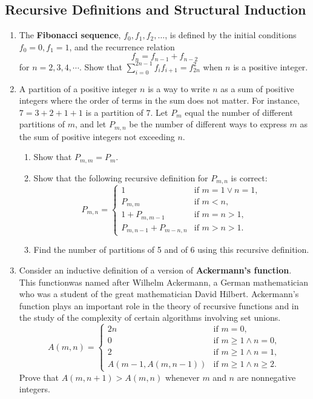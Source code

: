 \documentclass{../../cls/sig-alternate-05-2015}
\begin{document}
\subsection{Recursive Definitions and Structural Induction}
\begin{enumerate}
\item The \textbf{Fibonacci sequence},
$f_0, f_1, f_2, \ldots$,
is defined by the initial conditions $f_0 = 0, f_1 = 1$,
and the recurrence relation \begin{equation}
	f_n = f_{n - 1} + f_{n - 2}
\end{equation} for $n = 2, 3, 4, \cdots$.
Show that $\sum_{i = 0}^{2n - 1} f_i f_{i + 1} = f_{2n}^2$ when $n$ is a positive integer.

\item A partition of a positive integer $n$ is a way to write $n$ as a sum of positive integers where the order of terms in
the sum does not matter.
For instance, $7 = 3 + 2 + 1 + 1$ is a partition of $7$.
Let $P_m$ equal the number of different partitions of $m$,
and let $P_{m, n}$ be the number of different ways to express $m$ as the sum of positive integers not exceeding $n$. \begin{enumerate}
	\item Show that $P_{m, m} = P_m$.
	\item Show that the following recursive definition for $P_{m, n}$ is correct: \begin{equation}
		P_{m, n} = \begin{cases}
		1 & \text{if } m = 1 \lor n = 1,\\
		P_{m, m} & \text{if } m < n,\\
		1 + P_{m, m - 1} & \text{if } m = n > 1,\\
		P_{m, n - 1} + P_{m - n, n} & \text{if } m > n > 1.
		\end{cases}
	\end{equation}
	\item Find the number of partitions of 5 and of 6 using this recursive definition.
\end{enumerate}

\item Consider an inductive definition of a version of \textbf{Ackermann's function}.
This functionwas named after Wilhelm Ackermann,
a German mathematician who was a student of the great mathematician David Hilbert.
Ackermann's function plays an important role in the theory of recursive functions and in the study of the complexity of certain algorithms involving set unions.
\begin{equation}
	A(m, n) = \begin{cases}
	2n & \text{if } m = 0,\\
	0 & \text{if } m \ge 1 \land n = 0,\\
	2 & \text{if } m \ge 1 \land n = 1,\\
	A(m - 1, A(m, n - 1)) & \text{if } m \ge 1 \land n \ge 2.
	\end{cases}
\end{equation}
Prove that $A(m, n + 1) > A(m, n)$ whenever $m$ and $n$ are
nonnegative integers.

\end{enumerate}
\end{document}
